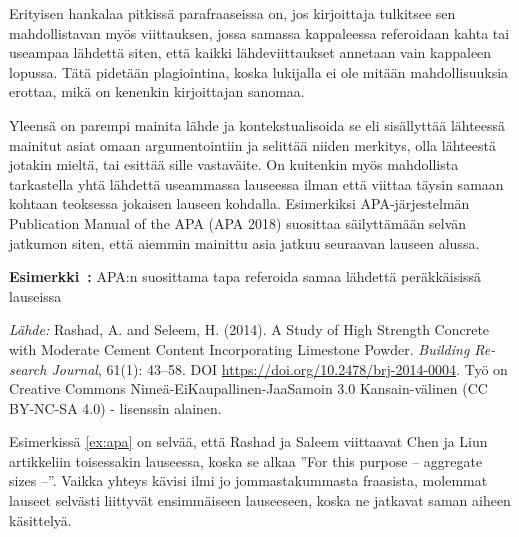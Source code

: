 \documentclass[finnish, 12pt, a4paper, arts, utf8, a-2b, online]{aaltothesis}
\begin{document}
Erityisen hankalaa pitkissä parafraaseissa on, jos kirjoittaja tulkitsee sen 
mahdollistavan myös viittauksen, jossa samassa kappaleessa referoidaan kahta tai
useampaa lähdettä siten, että kaikki lähdeviittaukset annetaan vain kappaleen 
lopussa. Tätä pidetään plagiointina, koska lukijalla ei ole mitään 
mahdollisuuksia erottaa, mikä on kenenkin kirjoittajan sanomaa.

Yleensä on parempi mainita lähde ja kontekstualisoida se eli sisällyttää 
lähteessä mainitut asiat omaan argumentointiin ja selittää niiden merkitys, olla 
lähteestä jotakin mieltä, tai esittää sille vastaväite. On kuitenkin myös 
mahdollista tarkastella yhtä lähdettä useammassa lauseessa ilman että viittaa 
täysin samaan kohtaan teoksessa jokaisen lauseen kohdalla. Esimerkiksi 
APA-järjestelmän Publication Manual of the APA (APA 2018) suosittaa säilyttämään
selvän jatkumon siten, että aiemmin mainittu asia jatkuu seuraavan lauseen 
alussa.

\vspace{1em}
\noindent
{}
\textsf{\textbf{Esimerkki~\theexample:}} \label{ex:apa}APA:n suosittama tapa 
referoida samaa lähdettä peräkkäisissä lauseissa 

\vspace{1ex}
\noindent
{}

\vspace{1ex}
\noindent
\textit{Lähde:} Rashad, A. and Seleem, H. (2014). A Study of High Strength 
Concrete with Moderate Cement Content Incorporating Limestone Powder. 
\textit{Building Re-search Journal}, 61(1): 43--58. 
DOI \url{https://doi.org/10.2478/brj-2014-0004}. 
Työ on Creative Commons Nimeä-EiKaupallinen-JaaSamoin 3.0 Kansain-välinen (CC 
BY-NC-SA 4.0) - lisenssin alainen.

\vspace{1em}
Esimerkissä \ref{ex:apa} on selvää, että Rashad ja Saleem viittaavat Chen ja 
Liun artikkeliin toisessakin lauseessa, koska se alkaa ”For this purpose -- 
aggregate sizes --”. Vaikka yhteys kävisi ilmi jo jommastakummasta fraasista, 
molemmat lauseet selvästi liittyvät ensimmäiseen lauseeseen, koska ne jatkavat 
saman aiheen käsittelyä.
\end{document}
